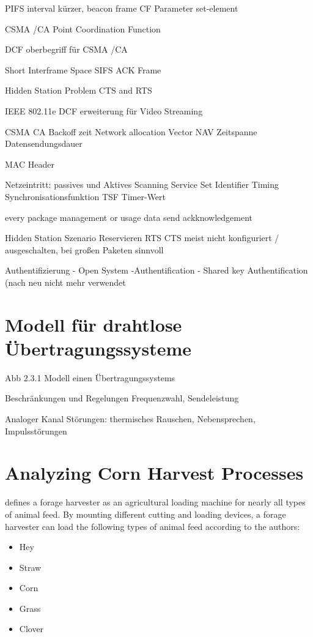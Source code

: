 \documentclass[]{nsm-thesis}
\begin{document}
PIFS interval kürzer, 
beacon frame
CF Parameter set-element

CSMA /CA
Point Coordination Function

\textcite{sauter_wireless_2022}
DCF oberbegriff für CSMA /CA
 
 
Short Interframe Space SIFS ACK Frame 
 
Hidden Station Problem 
CTS and RTS
 
IEEE 802.11e DCF erweiterung für Video Streaming

CSMA CA Backoff zeit
Network allocation Vector NAV Zeitspanne Datensendungsdauer

MAC Header

Netzeintritt:
passives und Aktives Scanning
Service Set Identifier
Timing Synchronisationsfunktion TSF Timer-Wert

\textcite{sauter_wireless_2022}
every package management or usage data send ackknowledgement

Hidden Station Szenario
Reservieren
RTS CTS
meist nicht konfiguriert / ausgeschalten, bei großen Paketen sinnvoll



Authentifizierung
- Open System -Authentification
- Shared key Authentification
(nach neu nicht mehr verwendet





\section{Modell für drahtlose Übertragungssysteme}

Abb 2.3.1  Modell einen Übertragungssystems

Beschränkungen und Regelungen Frequenzwahl, Sendeleistung

Analoger Kanal Störungen: thermisches Rauschen, Nebensprechen, Impulsstörungen



\section{Analyzing Corn Harvest Processes}

\textcite{seifert_feldhacksler_1962} defines a forage harvester as an agricultural loading machine for nearly all types of animal feed. By mounting different cutting and loading devices, a forage harvester can load the following types of animal feed according to the authors:
\begin{itemize}
	\item Hey
	\item Straw
	\item Corn
	\item Grass
		\item Clover 
\end{itemize}
\end{document}
